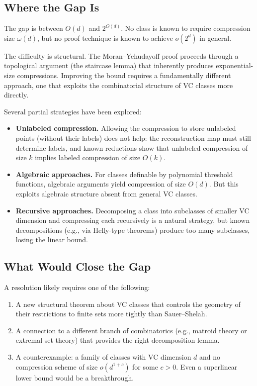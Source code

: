\subsection{Where the Gap Is}

The gap is between $O(d)$ and $2^{O(d)}$.  No class is known to require
compression size $\omega(d)$, but no proof technique is known to achieve
$o(2^d)$ in general.

The difficulty is structural.  The Moran--Yehudayoff proof proceeds through
a topological argument (the staircase lemma) that inherently produces
exponential-size compressions.  Improving the bound requires a fundamentally
different approach, one that exploits the combinatorial structure of VC
classes more directly.

Several partial strategies have been explored:

\begin{itemize}[leftmargin=*]
\item \textbf{Unlabeled compression.}  Allowing the compression to store
  unlabeled points (without their labels) does not help: the reconstruction
  map must still determine labels, and known reductions show that unlabeled
  compression of size $k$ implies labeled compression of size $O(k)$.

\item \textbf{Algebraic approaches.}  For classes definable by polynomial
  threshold functions, algebraic arguments yield compression of size $O(d)$.
  But this exploits algebraic structure absent from general VC classes.

\item \textbf{Recursive approaches.}  Decomposing a class into subclasses
  of smaller VC dimension and compressing each recursively is a natural
  strategy, but known decompositions (e.g., via Helly-type theorems) produce
  too many subclasses, losing the linear bound.
\end{itemize}

\subsection{What Would Close the Gap}

A resolution likely requires one of the following:

\begin{enumerate}[leftmargin=*]
\item A new structural theorem about VC classes that controls the geometry
  of their restrictions to finite sets more tightly than Sauer--Shelah.
\item A connection to a different branch of combinatorics (e.g., matroid
  theory or extremal set theory) that provides the right decomposition lemma.
\item A counterexample: a family of classes with VC dimension $d$ and
  no compression scheme of size $o(d^{1+c})$ for some $c > 0$.  Even a
  superlinear lower bound would be a breakthrough.
\end{enumerate}

